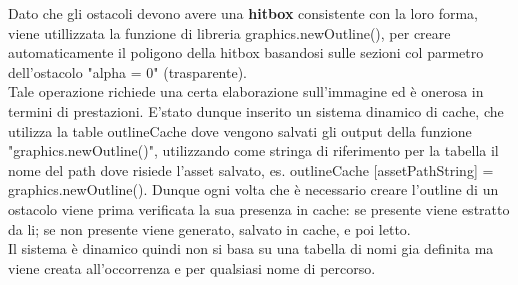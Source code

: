 \documentclass[12pt]{article}
\begin{document}
Dato che gli ostacoli devono avere una \textbf{hitbox} consistente con la loro forma, viene utillizzata la funzione di libreria 
graphics.newOutline(), per creare automaticamente il poligono della hitbox basandosi sulle sezioni col parmetro dell'ostacolo "alpha = 0" (trasparente).
\\

Tale operazione richiede una certa elaborazione sull’immagine ed è onerosa in termini di prestazioni. E'stato dunque inserito un sistema 
dinamico di cache, che utilizza la table outlineCache dove vengono salvati gli output della funzione "graphics.newOutline()", utilizzando come stringa di riferimento per la tabella il nome del path dove risiede l’asset salvato, es. outlineCache [assetPathString] = graphics.newOutline().
Dunque ogni volta che è necessario creare l’outline di un ostacolo viene prima verificata la sua presenza in cache: se presente viene 
estratto da li; se non presente viene generato, salvato in cache, e poi letto.
\\

Il sistema è dinamico quindi non si basa 
su una tabella di nomi gia definita ma viene creata all’occorrenza e per qualsiasi nome di percorso.
\end{document}
